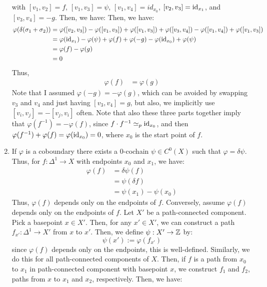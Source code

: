 \documentclass[12pt]{article}
\begin{document}
\begin{solution}
\begin{enumerate}
\begin{centering}
        \end{centering}    
        \bbni   
        with $[v_1, v_2] = f$, $[v_1, v_3] = \psi$, $[v_1, v_4] = id_{x_0}$, $[v_2, v_3] = \operatorname{id}_{x_1}$, and $[v_3, v_4] = -g$. Then, we have: 
        Then, we have:
        \begin{align*}
            \varphi(\delta (\sigma_1 + \sigma_2)) &= \varphi([v_2, v_3]) - \varphi([v_1, v_3]) + \varphi([v_1, v_3]) + \varphi([v_3, v_4]) - \varphi([v_1, v_4]) + \varphi([v_1, v_3]) \\
            &= \varphi(\operatorname{id}_{x_1}) - \varphi(\psi) + \varphi(f) + \varphi(-g) - \varphi(\operatorname{id}_{x_0}) +  \varphi(\psi) \\
            &= \varphi(f) - \varphi(g) \\
            &= 0
        \end{align*}
        Thus, 
        \begin{align*}
            \varphi(f) &= \varphi(g)
        \end{align*}
        Note that I assumed $\varphi(-g) = -\varphi(g)$, which can be avoided by swapping $v_3$ and $v_4$ and just having $[v_3, v_4] = g$, but also, we implicitly use $[v_i, v_j] = -[v_j, v_i]$ often. \bbni 
        Note that also these three parts together imply that $\varphi(f^{-1}) = -\varphi(f)$, since $f \cdot f^{-1} \simeq_p \operatorname{id}_{x_0}$, and then $\varphi(f^{-1}) + \varphi(f) = \varphi(\operatorname{id}_{x_0}) = 0$, where $x_0$ is the start point of $f$.
        \item If $\varphi$ is a coboundary there exists a $0$-cochain $\psi \in C^0(X)$ such that $\varphi = \delta \psi$. Thus, for $f: \Delta^1 \to X$ with endpoints $x_0$ and $x_1$, we have:
        \begin{align*}
            \varphi(f) &= \delta \psi(f) \\
            &= \psi(\delta f) \\
            &= \psi(x_1) - \psi(x_0)
        \end{align*}
        Thus, $\varphi(f)$ depends only on the endpoints of $f$. \bbni
        Conversely, assume $\varphi(f)$ depends only on the endpoints of $f$. Let $X'$ be a path-connected component. Pick a basepoint $x \in X'$. Then, for any $x' \in X'$, we can construct a path $f_{x'}: \Delta^1 \to X'$ from $x$ to $x'$. Then, we define $\psi: X' \to \mathbb Z$ by:
        \[ \psi(x') := \varphi(f_{x'})\]
        since $\varphi(f)$ depends only on the endpoints, this is well-defined. Similarly, we do this for all path-connected components of $X$. Then, if $f$ is a path from $x_0$ to $x_1$ in path-connected component with basepoint $x$, we construct $f_1$ and $f_2$, paths from $x$ to $x_1$ and $x_2$, respectively. Then, we have:

\end{enumerate}
\end{solution}
\end{document}
